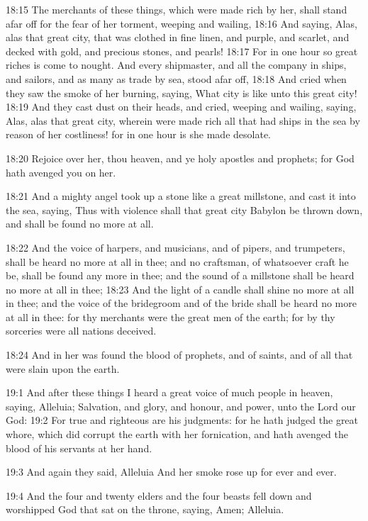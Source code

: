 18:15 The merchants of these things, which were made rich by her, shall stand afar off for the fear of her torment, weeping and wailing, 18:16 And saying, Alas, alas that great city, that was clothed in fine linen, and purple, and scarlet, and decked with gold, and precious stones, and pearls!  18:17 For in one hour so great riches is come to nought. And every shipmaster, and all the company in ships, and sailors, and as many as trade by sea, stood afar off, 18:18 And cried when they saw the smoke of her burning, saying, What city is like unto this great city!  18:19 And they cast dust on their heads, and cried, weeping and wailing, saying, Alas, alas that great city, wherein were made rich all that had ships in the sea by reason of her costliness!  for in one hour is she made desolate.

18:20 Rejoice over her, thou heaven, and ye holy apostles and prophets; for God hath avenged you on her.

18:21 And a mighty angel took up a stone like a great millstone, and cast it into the sea, saying, Thus with violence shall that great city Babylon be thrown down, and shall be found no more at all.

18:22 And the voice of harpers, and musicians, and of pipers, and trumpeters, shall be heard no more at all in thee; and no craftsman, of whatsoever craft he be, shall be found any more in thee; and the sound of a millstone shall be heard no more at all in thee; 18:23 And the light of a candle shall shine no more at all in thee; and the voice of the bridegroom and of the bride shall be heard no more at all in thee: for thy merchants were the great men of the earth; for by thy sorceries were all nations deceived.

18:24 And in her was found the blood of prophets, and of saints, and of all that were slain upon the earth.

19:1 And after these things I heard a great voice of much people in heaven, saying, Alleluia; Salvation, and glory, and honour, and power, unto the Lord our God: 19:2 For true and righteous are his judgments: for he hath judged the great whore, which did corrupt the earth with her fornication, and hath avenged the blood of his servants at her hand.

19:3 And again they said, Alleluia And her smoke rose up for ever and ever.

19:4 And the four and twenty elders and the four beasts fell down and worshipped God that sat on the throne, saying, Amen; Alleluia.

